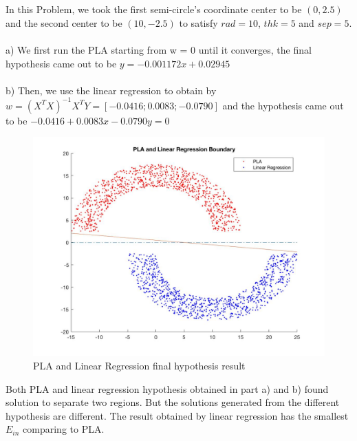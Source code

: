 \documentclass[12pt]{article}
\begin{document}
\newpage
{} \\\\
\indent In this Problem, we took the first semi-circle's coordinate center to be $(0,2.5)$ and the second center to be $(10,-2.5)$ to satisfy $rad = 10$, $thk = 5$ and $sep = 5$. \\\\
a) We first run the PLA starting from w = 0 until it converges, the final hypothesis came out to be $y = -0.001172x + 0.02945$\\\\
b) Then, we use the linear regression to obtain by $\displaystyle w = (X^TX)^{-1}X^TY = \left[-0.0416;0.0083;-0.0790\right]$ and the hypothesis came out to be $-0.0416+0.0083x-0.0790y=0$
\begin{figure}[H]
  \centering
  \includegraphics[scale = 0.35]{Pic1.jpg}
  \caption{PLA and Linear Regression final hypothesis result}
  \label{fig:Pic1}
\end{figure}
\indent Both PLA and linear regression hypothesis obtained in part a) and b) found solution to separate two regions. But the solutions generated from the different hypothesis are different. The result obtained by linear regression has the smallest $E_{in}$ comparing to PLA.\\
\end{document}
